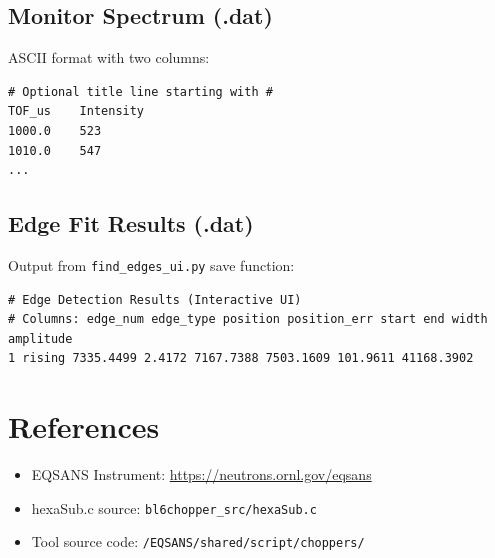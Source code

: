 \documentclass[11pt,letterpaper]{article}
\begin{document}
\subsection{Monitor Spectrum (.dat)}

ASCII format with two columns:
\begin{lstlisting}
# Optional title line starting with #
TOF_us    Intensity
1000.0    523
1010.0    547
...
\end{lstlisting}

\subsection{Edge Fit Results (.dat)}

Output from \texttt{find\_edges\_ui.py} save function:
\begin{lstlisting}
# Edge Detection Results (Interactive UI)
# Columns: edge_num edge_type position position_err start end width amplitude
1 rising 7335.4499 2.4172 7167.7388 7503.1609 101.9611 41168.3902
\end{lstlisting}

\section{References}

\begin{itemize}
    \item EQSANS Instrument: \url{https://neutrons.ornl.gov/eqsans}
    \item hexaSub.c source: \texttt{bl6chopper\_src/hexaSub.c}
    \item Tool source code: \texttt{/EQSANS/shared/script/choppers/}
\end{itemize}
\end{document}
